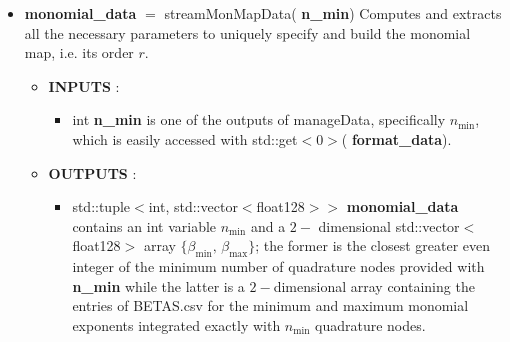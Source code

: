 \documentclass[a4paper, twosided]{book}
\begin{document}
\begin{itemize}
    
    \item \color{poliDarkBlue} \textbf{monomial\_data} \color{black} $=$ \colorbox{poliGrayBlue}{streamMonMapData}(\color{poliDarkBlue} \textbf{n\_min}\color{black})
    \newline Computes and extracts all the necessary parameters to uniquely specify and build the monomial map, i.e. its order $r$.
    \begin{itemize}
        \item \color{poliDarkBlue} \textbf{INPUTS} \color{black}:
        \begin{itemize}
            \item \colorbox{poliGrayBlue}{int} \color{poliDarkBlue} \textbf{n\_min} \color{black} is one of the outputs of \colorbox{poliGrayBlue}{manageData}, specifically $n_{\text{min}}$, which is easily accessed with \colorbox{poliGrayBlue}{std::get$<$0$>$}(\color{poliDarkBlue} \textbf{format\_data}\color{black}).
        \end{itemize}
        \item \color{poliDarkBlue} \textbf{OUTPUTS} \color{black}:
        \begin{itemize}
            \item \colorbox{poliGrayBlue}{std::tuple$<$int, std::vector$<$float128$>>$} \color{poliDarkBlue} \textbf{monomial\_data} \color{black} contains an \colorbox{poliGrayBlue}{int} variable $n_{\text{min}}$ and a $2-$ dimensional \colorbox{poliGrayBlue}{std::vector$<$float128$>$} array $\{\beta_{\text{min}}, \,\beta_{\text{max}}\}$; the former is the closest greater even integer of the minimum number of quadrature nodes provided with \color{poliDarkBlue} \textbf{n\_min} \color{black} while the latter is a $2-$dimensional array containing the entries of \colorbox{poliGrayBlue}{BETAS.csv}
            for the minimum and maximum monomial exponents integrated exactly with $n_{\text{min}}$ quadrature nodes.
        \end{itemize}
    \end{itemize}
    

\end{itemize}
\end{document}
